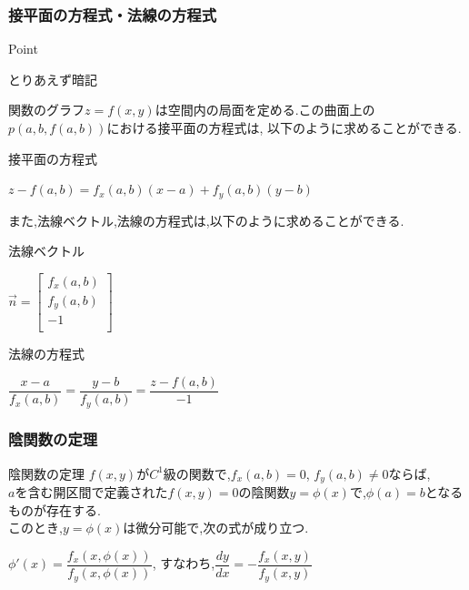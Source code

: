 \documentclass[a4paper]{jsarticle}
\begin{document}
\subsubsection{接平面の方程式・法線の方程式}
\begin{itembox}[l]{Point}
    \begin{center}
        とりあえず暗記
    \end{center}
\end{itembox}
関数のグラフ$z=f\left(x,y\right)$は空間内の局面を定める.この曲面上の$p(a,b,f\left(a,b\right))$における接平面の方程式は,
以下のように求めることができる.
\begin{itembox}[l]{接平面の方程式}
    \begin{center}
        $z-f\left(a,b\right)=f_x\left(a,b\right)\left(x-a\right)+f_y\left(a,b\right)\left(y-b\right)$
    \end{center}
\end{itembox}
また,法線ベクトル,法線の方程式は,以下のように求めることができる.
\begin{itembox}[l]{法線ベクトル}
    \begin{center}
        $ \vec{n}=
            \begin{bmatrix}
                f_x\left(a,b\right) \\
                f_y\left(a,b\right) \\
                -1                  \\
            \end{bmatrix}
        $
    \end{center}
\end{itembox}
\begin{itembox}[l]{法線の方程式}
    \begin{center}
        $\dfrac{x-a}{f_x\left(a,b\right)}=\dfrac{y-b}{f_y\left(a,b\right)}=\dfrac{z-f\left(a,b\right)}{-1}$
    \end{center}
\end{itembox}
\subsubsection{陰関数の定理}
\begin{itembox}[l]{陰関数の定理}
    $f\left(x,y\right)$が$C^1$級の関数で,$f_x\left(a,b\right)=0$, $f_y\left(a,b\right)\neq0$ならば,\\
    $a$を含む開区間で定義された$f(x,y)=0$の陰関数$y=\phi\left(x\right)$で,$\phi\left(a\right)=b$となるものが存在する.\\
    このとき,$y=\phi\left(x\right)$は微分可能で,次の式が成り立つ.
    \begin{center}
        $\phi'\left(x\right)=\dfrac{f_x\left(x,\phi\left(x\right)\right)}{f_y\left(x,\phi\left(x\right)\right)}$,
        \quad すなわち,\quad$\dfrac{dy}{dx}=-\dfrac{f_x\left(x,y\right)}{f_y\left(x,y\right)}$
    \end{center}
\end{itembox}
\end{document}
